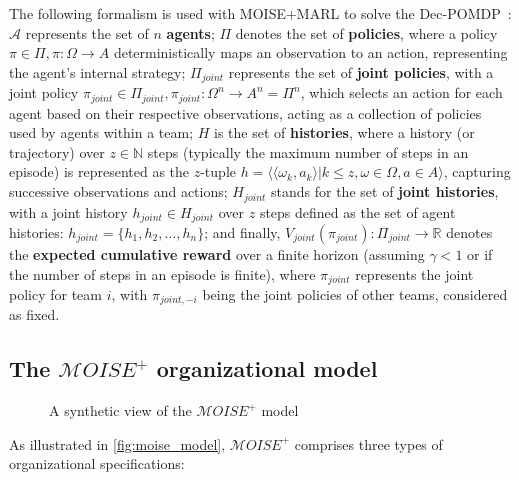 \documentclass[sigconf]{aamas}
\begin{document}
The following formalism is used with MOISE+MARL to solve the Dec-POMDP~\cite{Beynier2013,Albrecht2024}: $\mathcal{A}$ represents the set of $n$ \textbf{agents}; $\Pi$ denotes the set of \textbf{policies}, where a policy $\pi \in \Pi, \pi: \Omega \rightarrow A$ deterministically maps an observation to an action, representing the agent's internal strategy; $\Pi_{joint}$ represents the set of \textbf{joint policies}, with a joint policy $\pi_{joint} \in \Pi_{joint}, \pi_{joint}: \Omega^n \rightarrow A^n = \Pi^n$, which selects an action for each agent based on their respective observations, acting as a collection of policies used by agents within a team; $H$ is the set of \textbf{histories}, where a history (or trajectory) over $z \in \mathbb{N}$ steps (typically the maximum number of steps in an episode) is represented as the $z$-tuple $h = \langle \langle \omega_{k}, a_{k}\rangle | k \leq z, \omega \in \Omega, a \in A\rangle$, capturing successive observations and actions; $H_{joint}$ stands for the set of \textbf{joint histories}, with a joint history $h_{joint} \in H_{joint}$ over $z$ steps defined as the set of agent histories: $h_{joint} = \{h_1, h_2, \dots, h_n\}$; and finally, $V_{joint}(\pi_{joint}): \Pi_{joint} \rightarrow \mathbb{R}$ denotes the \textbf{expected cumulative reward} over a finite horizon (assuming $\gamma < 1$ or if the number of steps in an episode is finite), where $\pi_{joint}$ represents the joint policy for team $i$, with $\pi_{joint,-i}$ being the joint policies of other teams, considered as fixed.



\subsection{The $\mathcal{M}OISE^+$ organizational model}

\begin{figure}[h!]
  
  \caption{A synthetic view of the $\mathcal{M}OISE^+$ model}
  \label{fig:moise_model}
\end{figure}

As illustrated in \autoref{fig:moise_model}, $\mathcal{M}OISE^+$ comprises three types of organizational specifications:
\end{document}

